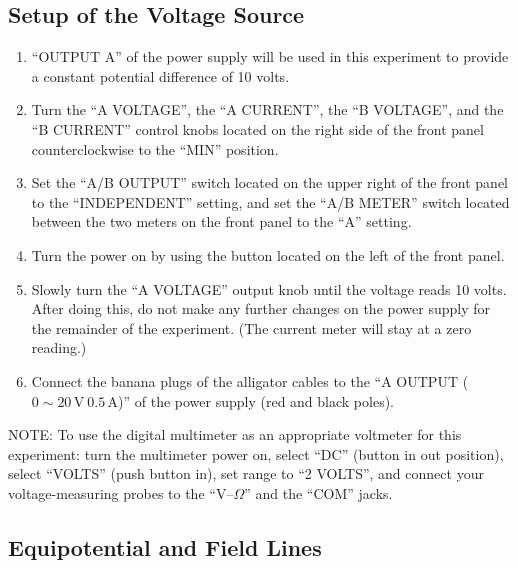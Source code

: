 \subsection{Setup of the Voltage Source}

\begin{enumerate}
    \item ``OUTPUT A'' of the power supply will be used in this experiment to provide a constant potential difference of 10 volts.
    \item Turn the ``A VOLTAGE'', the ``A CURRENT'', the ``B VOLTAGE'', and the ``B CURRENT'' control knobs located on the right side of the front panel counterclockwise to the ``MIN'' position.
    \item Set the ``A/B OUTPUT'' switch located on the upper right of the front panel to the ``INDEPENDENT'' setting, and set the ``A/B METER'' switch located between the two meters on the front panel to the ``A'' setting.
    \item Turn the power on by using the button located on the left of the front panel.
    \item Slowly turn the ``A VOLTAGE'' output knob until the voltage reads 10 volts. After doing this, do not make any further changes on the power supply for the remainder of the experiment. (The current meter will stay at a zero reading.)
    \item Connect the banana plugs of the alligator cables to the ``A OUTPUT ($0\sim 20\,\mathrm{V}\  0.5\,\mathrm{A}$)'' of the power supply (red and black poles).
\end{enumerate}

NOTE: To use the digital multimeter as an appropriate voltmeter for this experiment: turn the multimeter power on, select ``DC'' (button in out position), select ``VOLTS'' (push button in), set range to ``2 VOLTS'', and connect your voltage-measuring probes to the ``$\mathrm{V}$--$\Omega$'' and the ``COM'' jacks.

\subsection{Equipotential and Field Lines}

